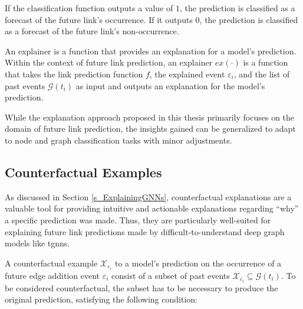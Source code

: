 If the classification function outputs a value of $1$, the prediction is classified as a forecast of the future link's occurrence. If it outputs $0$, the prediction is classified as a forecast of the future link's non-occurrence.

An explainer is a function that provides an explanation for a model's prediction. Within the context of future link prediction, an explainer $ex(\cdot)$ is a function that takes the link prediction function $f$, the explained event $\varepsilon_{i}$, and the list of past events $\mathcal{G}(t_i)$ as input and outputs an explanation for the model's prediction.

While the explanation approach proposed in this thesis primarily focuses on the domain of future link prediction, the insights gained can be generalized to adapt to node and graph classification tasks with minor adjustments.

\subsection{Counterfactual Examples}
\label{s_ProblemFormulation_CFExamples}

As discussed in Section \ref{s_ExplainingGNNs}, counterfactual explanations are a valuable tool for providing intuitive and actionable explanations regarding “why” a specific prediction was made. Thus, they are particularly well-suited for explaining future link predictions made by difficult-to-understand deep graph models like \glspl{tgnn}.


A counterfactual example $\mathcal{X}_{\varepsilon_i}$ to a model's prediction on the occurrence of a future edge addition event $\varepsilon_{i}$ consist of a subset of past events $\mathcal{X}_{\varepsilon_i} \subseteq \mathcal{G}(t_i)$. To be considered counterfactual, the subset has to be necessary to produce the original prediction, satisfying the following condition:

